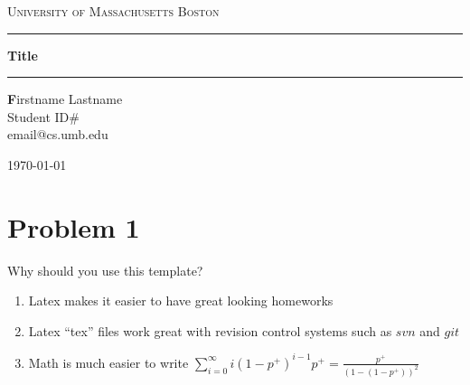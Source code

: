 \documentclass[12pt,letterpaper]{article}
\makeatletter
\def\thetitle{Title}
\def\theauthor{Firstname Lastname}
\def\email{email@cs.umb.edu}
\def\studentid{Student ID\#}
\def\thedate{\today}
\def\university{University of Massachusetts Boston}
\makeatother
\begin{document}
\begin{titlepage}
\begin{center}
\textsc{\LARGE \university}\vspace{10mm}
\hrule\vspace{2mm}
\huge\bfseries\thetitle\vspace{2mm}
\hrule\vspace{10mm}
\end{center}
\begin{flushleft}
\textbf\theauthor\\
\studentid\\
\email\\

\end{flushleft}
\vfill
\begin{center}
\thedate
\end{center}
\end{titlepage}

\newpage


\section*{Problem 1}

Why should you use this template?

\begin{enumerate}
  \item Latex makes it easier to have great looking homeworks
  \item Latex ``tex'' files work great with revision control systems such as
  $svn$ and $git$
  \item Math is much easier to write $\displaystyle\sum_{i=0}^\infty
  i(1-p^+)^{i-1}p^+ = \frac{p^+}{(1-(1-p^+))^2}$
\end{enumerate}
\end{document}
